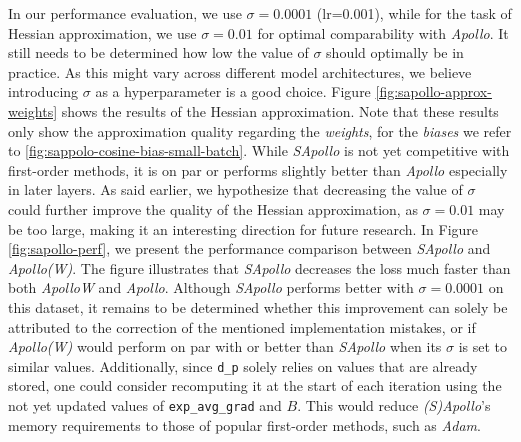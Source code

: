     In our performance evaluation, we use $\sigma = 0.0001$ (lr=0.001), while for the task of Hessian approximation, we use $\sigma = 0.01$ for optimal comparability with \emph{Apollo}.
    It still needs to be determined how low the value of $\sigma$ should optimally be in practice.
    As this might vary across different model architectures, we believe introducing $\sigma$ as a hyperparameter is a good choice.
    Figure \ref{fig:sapollo-approx-weights} shows the results of the Hessian approximation. Note that these results only show the
    approximation quality regarding the \emph{weights}, for the \emph{biases} we refer to \ref{fig:sappolo-cosine-bias-small-batch}.
    While \emph{SApollo} is not yet competitive with first-order methods, it is on par or performs slightly better than \emph{Apollo} especially in later layers.
    As said earlier, we hypothesize that decreasing the value of $\sigma$ could further improve the quality of the Hessian approximation, as $\sigma=0.01$ may be too large,
    making it an interesting direction for future research.
    In Figure \ref{fig:sapollo-perf}, we present the performance comparison between \emph{SApollo} and  \emph{Apollo(W)}.
    The figure illustrates that \emph{SApollo} decreases the loss much faster than both \emph{ApolloW} and \emph{Apollo}.
    Although \emph{SApollo} performs better with $\sigma = 0.0001$ on this dataset, it remains to be determined whether this improvement can solely
    be attributed to the correction of the mentioned implementation mistakes,
    or if \emph{Apollo(W)} would perform on par with or better than \emph{SApollo} when its $\sigma$ is set to similar values.
    Additionally, since \texttt{d\_p} solely relies on values that are already stored, one could consider recomputing it at the start of each iteration
    using the not yet updated values of \texttt{exp\_avg\_grad} and $B$.
    This would reduce \emph{(S)Apollo}'s memory requirements to those of popular first-order methods, such as \emph{Adam}.


